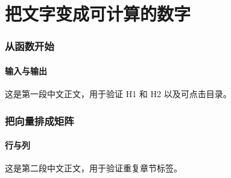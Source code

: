 \documentclass[11pt,a4paper]{article}
\begin{document}
\tableofcontents
\part{把文字变成可计算的数字}
\section{从函数开始}
\subsection{输入与输出}
这是第一段中文正文，用于验证 H1 和 H2 以及可点击目录。
\section{把向量排成矩阵}
\subsection{行与列}
这是第二段中文正文，用于验证重复章节标签。
\end{document}
